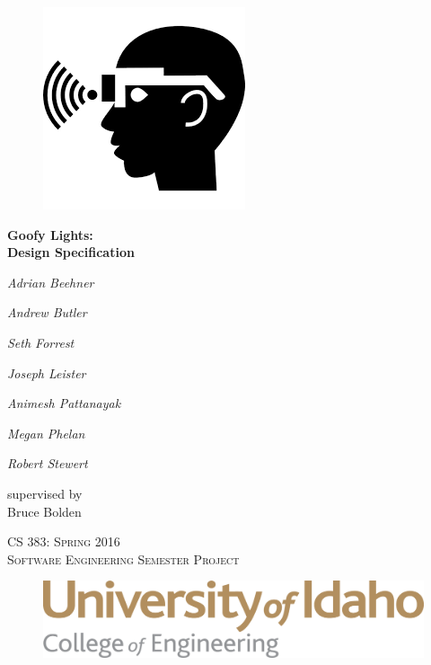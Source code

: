 \documentclass[12pt]{article}
\begin{document}
	\begin{titlepage}
		\centering	
    
    \begin{figure}[h]
      \centering
      \includegraphics[width=0.45\linewidth]{glassesIcon.png}
    \end{figure} 
  
  {\huge\bfseries Goofy Lights: \\ Design Specification\par}
    
		{ 		
  		{\Large\itshape Adrian Beehner\par}
  		{\Large\itshape Andrew Butler\par}
  		{\Large\itshape Seth Forrest\par}
  		{\Large\itshape Joseph Leister\par}
  		{\Large\itshape Animesh Pattanayak\par}
  		{\Large\itshape Megan Phelan\par}
  		{\Large\itshape Robert Stewert\par}		
		}		
    \vspace{.25cm}	
    
		supervised by \\
		Bruce Bolden		
    
    \vspace{.5cm} 
    
    {\scshape\Large 
      CS 383: Spring 2016 \\
      Software Engineering Semester Project
      \par}
    
    \begin{figure}[h]
      \centering
      \includegraphics[width=0.7\linewidth]{uislogan}
    \end{figure} 
  
		\vfill		
	\end{titlepage}
\end{document}
